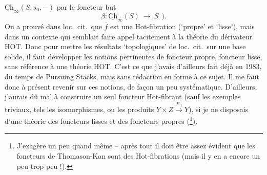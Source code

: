 \documentclass[11pt]{article}
\newcommand{\Ch}{\underline{\mathrm{Ch}}}
\begin{document}
$\Ch_{\infty}(S; s_0, -)$ par le foncteur but
\[
\beta : \Ch_{\infty}(S) \ \longrightarrow\ S \ \ ).
\]
On a prouvé dans loc.\ cit.\ que $\overline{f}$ est une Hot-fibration (‘propre’ et ‘lisse’), mais dans un contexte qui semblait faire appel tacitement à la théorie du dérivateur HOT. Donc pour mettre les résultats ‘topologiques’ de loc.\ cit.\ sur une base solide, il faut développer les notions pertinentes de foncteur propre, foncteur lisse, sans référence à une théorie HOT. C'est ce que j'avais d'ailleurs fait déjà en 1983, du temps de Pursuing Stacks, mais sans rédaction en forme à ce sujet. Il me faut donc à présent revenir sur ces notions, de façon un peu systématique. D'ailleurs, j'aurais dû mal à construire un seul foncteur Hot-fibrant (sauf les exemples triviaux, tels les isomorphismes, ou les produits $Y \times Z \xrightarrow{\mathrm{pr}_1} Y$), si je ne disposais d'une théorie des foncteurs lisses et des foncteurs propres (\footnote{J'exagère un peu quand même -- après tout il doit être assez évident que les foncteurs de Thomason-Kan sont des Hot-fibrations (mais il y en a encore un peu trop peu !).}). %
\end{document}

